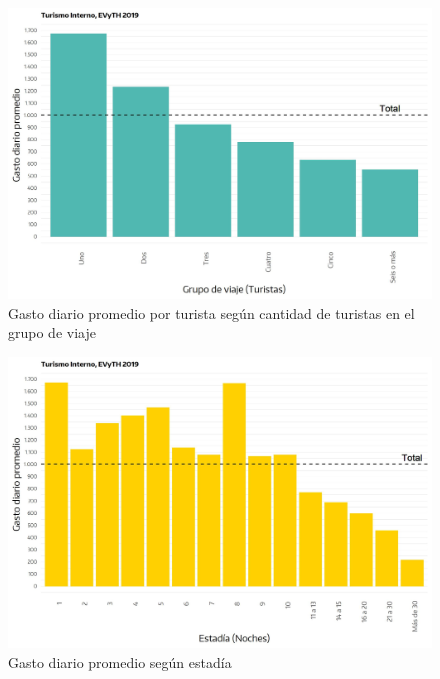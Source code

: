 \documentclass[
]{book}
\begin{document}
\begin{figure}

{\centering \includegraphics[width=1\linewidth,height=1\textheight]{imagenes/DT4_grafico18_a} 

}

\caption{Gasto diario promedio por turista según cantidad de turistas en el grupo de viaje}\label{fig:grafico18a}
\end{figure}

\begin{figure}

{\centering \includegraphics[width=1\linewidth,height=1\textheight]{imagenes/DT4_grafico18_b} 

}

\caption{Gasto diario promedio según estadía}\label{fig:grafico18b}
\end{figure}
\end{document}
